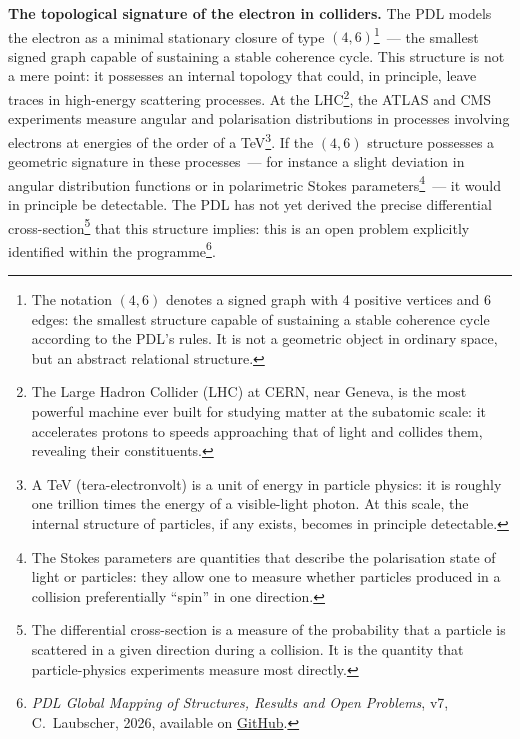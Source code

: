 \documentclass[12pt, a4paper, openright]{book}
\begin{document}
\textbf{The topological signature of the electron in colliders.} The PDL models the electron as a minimal stationary closure of type $(4,6)$\footnote{The notation $(4,6)$ denotes a signed graph with 4 positive vertices and 6 edges: the smallest structure capable of sustaining a stable coherence cycle according to the PDL's rules. It is not a geometric object in ordinary space, but an abstract relational structure.}~--- the smallest signed graph capable of sustaining a stable coherence cycle. This structure is not a mere point: it possesses an internal topology that could, in principle, leave traces in high-energy scattering processes. At the LHC\footnote{The Large Hadron Collider (LHC) at CERN, near Geneva, is the most powerful machine ever built for studying matter at the subatomic scale: it accelerates protons to speeds approaching that of light and collides them, revealing their constituents.}, the ATLAS and CMS experiments measure angular and polarisation distributions in processes involving electrons at energies of the order of a TeV\footnote{A TeV (tera-electronvolt) is a unit of energy in particle physics: it is roughly one trillion times the energy of a visible-light photon. At this scale, the internal structure of particles, if any exists, becomes in principle detectable.}. If the $(4,6)$ structure possesses a geometric signature in these processes~--- for instance a slight deviation in angular distribution functions or in polarimetric Stokes parameters\footnote{The Stokes parameters are quantities that describe the polarisation state of light or particles: they allow one to measure whether particles produced in a collision preferentially ``spin'' in one direction.}~--- it would in principle be detectable. The PDL has not yet derived the precise differential cross-section\footnote{The differential cross-section is a measure of the probability that a particle is scattered in a given direction during a collision. It is the quantity that particle-physics experiments measure most directly.} that this structure implies: this is an open problem explicitly identified within the programme\footnote{\textit{PDL Global Mapping of Structures, Results and Open Problems}, v7, C.~Laubscher, 2026, available on \href{https://github.com/laubscher-lab/PDL-framework}{GitHub}.}.

\medskip
\end{document}
